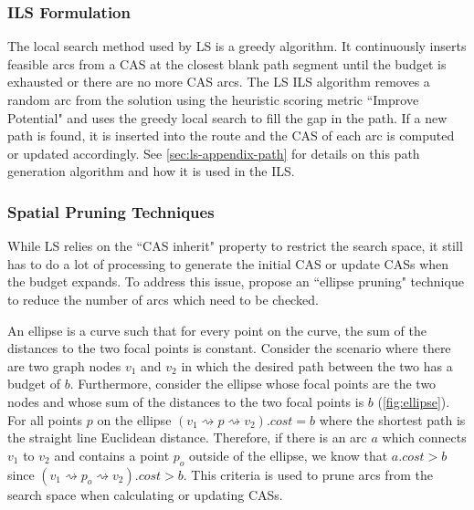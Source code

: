 \documentclass[honors]{union-cs-thesis}
\newcommand{\spa}{\rightsquigarrow}
\newcommand{\td}{\todo[inline]}
\begin{document}


\subsubsection{ILS Formulation}
The local search method used by LS is a greedy algorithm. It continuously inserts feasible arcs from a CAS at the closest blank path segment until the budget is exhausted or there are no more CAS arcs. The LS ILS algorithm removes a random arc from the solution using the heuristic scoring metric ``Improve Potential" and uses the greedy local search to fill the gap in the path. If a new path is found, it is inserted into the route and the CAS of each arc is computed or updated accordingly. See \cref{sec:ls-appendix-path} for details on this path generation algorithm and how it is used in the ILS. 


\subsubsection{Spatial Pruning Techniques}\label{sec:pruning}
While LS relies on the ``CAS inherit" property to restrict the search space, it still has to do a lot of processing to generate the initial CAS or update CASs when the budget expands. To address this issue,  \citeauthor{lu2015arc} propose an ``ellipse pruning" technique to reduce the number of arcs which need to be checked.


An ellipse is a curve such that for every point on the curve, the sum of the distances to the two focal points is constant. Consider the scenario where there are two graph nodes $v_1$ and $v_2$ in which the desired path between the two has a budget of $b$. Furthermore, consider the ellipse whose focal points are the two nodes and whose sum of the distances to the two focal points is $b$ (\cref{fig:ellipse}). For all points $p$ on the ellipse $(v_1 \spa p \spa v_2).cost = b$ where the shortest path is the straight line Euclidean distance. Therefore, if there is an arc $a$ which connects $v_1$ to $v_2$ and contains a point $p_o$ outside of the ellipse, we know that $a.cost > b$ since $(v_1 \spa p_o \spa v_2).cost > b$. This criteria is used to prune arcs from the search space when calculating or updating CASs.
\end{document}
